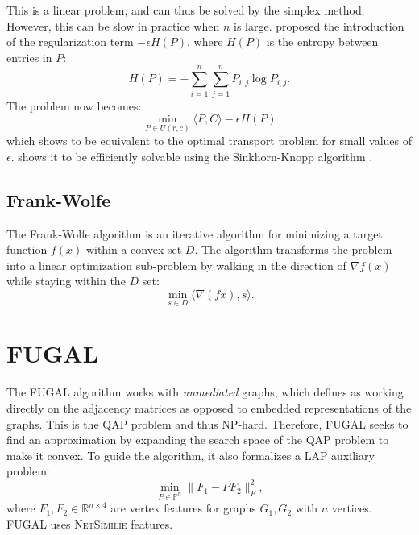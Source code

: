 \documentclass{article}
\begin{document}
This is a linear problem, and can thus be solved by the simplex method. However, this can be slow in practice when $n$ is large. \citep{cuturi2013sinkhorn} proposed the introduction of the regularization term $-\epsilon H(P)$, where $H(P)$ is the entropy between entries in $P$:
$$ H(P) = -\sum^{n}_{i = 1} \sum^{n}_{j = 1} P_{i, j} \log P_{i, j}. $$
The problem now becomes:
$$ \min_{P \in U(r, c)} \langle P, C \rangle - \epsilon H(P) $$
which \citep{cuturi2013sinkhorn} shows to be equivalent to the optimal transport problem for small values of $\epsilon$. \citep{cuturi2013sinkhorn} shows it to be efficiently solvable using the Sinkhorn-Knopp algorithm \citep{sinkhorn1967concerning}.

\subsection{Frank-Wolfe}
The Frank-Wolfe algorithm is an iterative algorithm for minimizing a target function $f(x)$ within a convex set $D$. The algorithm transforms the problem into a linear optimization sub-problem by walking in the direction of $\nabla f(x)$ while staying within the $D$ set:
$$ \min_{s \in D} \langle \nabla (fx), s \rangle. $$

\section{FUGAL}
The FUGAL algorithm works with \textit{unmediated} graphs, which \citep{fugal2024} defines as working directly on the adjacency matrices as opposed to embedded representations of the graphs. This is the QAP problem and thus NP-hard. Therefore, FUGAL seeks to find an approximation by expanding the search space of the QAP problem to make it convex. To guide the algorithm, it also formalizes a LAP auxiliary problem:
$$  \min_{P \in \mathds{P}^n} \lVert F_1 - P F_2 \rVert^2_F, $$
where $F_1, F_2 \in \mathds{R}^{n \times 4}$ are vertex features for graphs $G_1, G_2$ with $n$ vertices. FUGAL uses \textsc{NetSimilie}\citep{berlingerio2013network} features.
\end{document}
